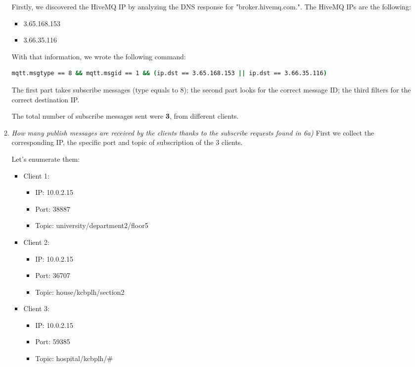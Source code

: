 \documentclass{article}
\begin{document}
\begin{enumerate}
\begin{enumerate}
        Firstly, we discovered the HiveMQ IP by analyzing the DNS response for "broker.hivemq.com.". The HiveMQ IPs are the following:
        \begin{itemize}
            \item 3.65.168.153
            \item 3.66.35.116
        \end{itemize}
        \newpage
        With that information, we wrote the following command:
        \begin{lstlisting}[language=bash]
mqtt.msgtype == 8 && mqtt.msgid == 1 && (ip.dst == 3.65.168.153 || ip.dst == 3.66.35.116)
        \end{lstlisting}

        The first part takes subscribe messages (type equals to 8); the second part looks for the correct message ID; the third filters for the correct destination IP.

        The total number of subscribe messages sent were \textbf{3}, from different clients.

        \item \textit{How many publish messages are received by the clients thanks to the
subscribe requests found in 6a)}
        First we collect the corresponding IP, the specific port and topic of subscription of the 3 clients.

        Let's enumerate them:
        \begin{itemize}
            \item Client 1: 
            \begin{itemize}
                \item IP: 10.0.2.15
                \item Port: 38887
                \item Topic: university/department2/floor5
            \end{itemize}
            \item Client 2:
            \begin{itemize}
                \item IP: 10.0.2.15
                \item Port: 36707
                \item Topic: house/kcbplh/section2
            \end{itemize}
             \item Client 3:
            \begin{itemize}
                \item IP: 10.0.2.15
                \item Port: 59385
                \item Topic: hospital/kcbplh/\#
            \end{itemize}
        \end{itemize}


\end{enumerate}
\end{enumerate}
\end{document}
